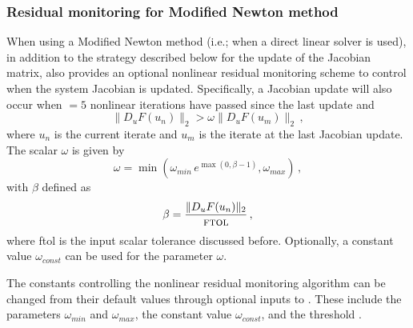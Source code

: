 \subsubsection*{Residual monitoring for Modified Newton method}
When using a Modified Newton method (i.e.; when a direct linear solver is 
used), in addition to the strategy described below for the update of the Jacobian 
matrix, {\kinsol} also provides an optional nonlinear residual monitoring
scheme to control when the system Jacobian is updated. Specifically, a Jacobian 
update will also occur when $=5$ nonlinear iterations have passed 
since the last update and 
\[ \|D_{u}F(u_n)\|_2 > \omega \|D_{u}F(u_m)\|_2 \, , \]
where $u_n$ is the current iterate and $u_m$ is the iterate at the last Jacobian
update. The scalar $\omega$ is given by
\begin{equation}
\omega = \min \left (\omega_{min} \, e^{\max \left ( 0 , \beta - 1 \right )} , \omega_{max}\right ) \, ,
\end{equation}
with $\beta$ defined as
\begin{equation}
\beta = \frac{\| D_{u}F(u_n) \|_2}{\mbox{{\sc ftol}}} \, ,
\end{equation}
where {\sc ftol} is the input scalar tolerance discussed before.
Optionally, a constant value $\omega_{const}$ can be used for the parameter $\omega$.


The constants controlling the nonlinear residual monitoring algorithm can
be changed from their default values through optional inputs to {\kinsol}.
These include the parameters $\omega_{min}$ and $\omega_{max}$, the constant 
value $\omega_{const}$, and the threshold .


